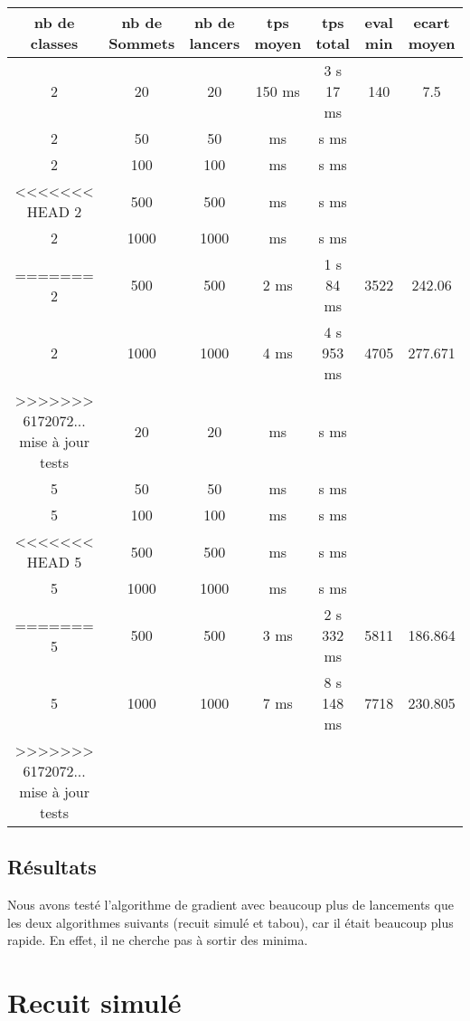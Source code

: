 \documentclass[12pt]{article}
\begin{document}
\begin{tabular}{|c|c|c|c|c|c|c|}
	\hline 
	nb de classes & nb de Sommets & nb de lancers & tps moyen & tps total & eval min & ecart moyen \\
	\hline
	2 & 20 & 20 & 150 ms & 3 s 17 ms & 140 & 7.5 \\
	\hline
	2 &  50  &  50  &     ms   &    s    ms   &     &     \\
	\hline
	2 &  100  &  100  &     ms   &   s    ms    &     &     \\
	\hline
<<<<<<< HEAD
	2 &  500  &  500  &      ms  &    s    ms   &     &     \\
	\hline
	2 &  1000  &  1000  &    ms    &   s    ms    &     &     \\
=======
	2 &  500  &  500  &   2 ms  &  1  s  84  ms   & 3522  & 242.06\\
	\hline
	2 &  1000  &  1000  &  4  ms & 4  s 953 ms & 4705 & 277.671 \\
>>>>>>> 6172072... mise à jour tests
	\hline
	\hline
	5 &  20  &  20  &     ms   &   s    ms    &     &     \\
	\hline
	5 &  50  &  50  &     ms   &   s     ms   &     &     \\
	\hline
	5 &  100  & 100   &     ms   &   s    ms    &     &     \\
	\hline
<<<<<<< HEAD
	5 & 500   & 500   &     ms   &   s     ms   &     &     \\
	\hline
	5 &  1000  &  1000  &     ms   &   s    ms    &     &     \\
=======
	5 & 500 & 500 & 3 ms   &  2 s 332 ms   &   5811  & 186.864 \\
	\hline
	5 &  1000  &  1000  & 7 ms &  8 s 148 ms & 7718 & 230.805 \\
>>>>>>> 6172072... mise à jour tests
	\hline
\end{tabular}

\subsection{Résultats}

Nous avons testé l’algorithme de gradient avec beaucoup plus de lancements que les deux algorithmes suivants (recuit simulé et tabou), car il était beaucoup plus rapide. En effet, il ne cherche pas à sortir des minima.

\newpage

\section{Recuit simulé}
\end{document}
